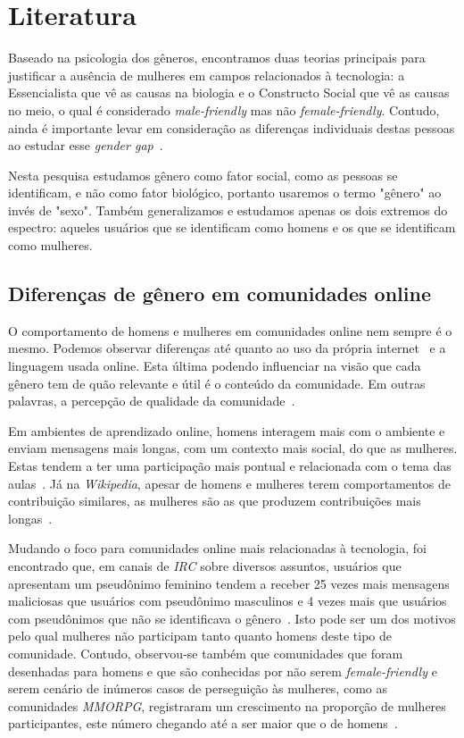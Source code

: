 \chapter{Literatura}

Baseado na psicologia dos gêneros, encontramos duas teorias principais para justificar a ausência de mulheres em campos relacionados à tecnologia: a Essencialista que vê as causas na biologia e o Constructo Social que vê as causas no meio, o qual é considerado \emph{male-friendly} mas não \emph{female-friendly}. Contudo, ainda é importante levar em consideração as diferenças individuais destas pessoas ao estudar esse \emph{gender gap}~\cite{trauth2004understanding}.

Nesta pesquisa estudamos gênero como fator social, como as pessoas se identificam, e não como fator biológico, portanto usaremos o termo "gênero" ao invés de "sexo". Também generalizamos e estudamos apenas os dois extremos do espectro: aqueles usuários que se identificam como homens e os que se identificam como mulheres. 

\section{Diferenças de gênero em comunidades online}

O comportamento de homens e mulheres em comunidades online nem sempre é o mesmo. Podemos observar diferenças até quanto ao uso da própria internet~\cite{hargittai2006differences} e a linguagem usada online. Esta última podendo influenciar na visão que cada gênero tem  de quão relevante e útil é o conteúdo da comunidade. Em outras palavras, a percepção de qualidade da comunidade~\cite{Gefen:2005:YSS:1066149.1066156}.

Em ambientes de aprendizado online, homens interagem mais com o ambiente e enviam mensagens mais longas, com um contexto mais social, do que as mulheres. Estas tendem a ter uma participação mais pontual e relacionada com o tema das aulas~\cite{barrett1999gender}. Já na \emph{Wikipedia}, apesar de homens e mulheres terem comportamentos de contribuição similares, as mulheres são as que produzem contribuições mais longas~\cite{glott2010wikipedia}.

Mudando o foco para comunidades online mais relacionadas à tecnologia, foi encontrado que, em canais de \emph{IRC} sobre diversos assuntos, usuários que apresentam um pseudônimo feminino tendem a receber 25 vezes mais mensagens maliciosas que usuários com pseudônimo masculinos e 4 vezes mais que usuários com pseudônimos que não se identificava o gênero~\cite{meyer2006assessing}. Isto pode ser um dos motivos pelo qual mulheres não participam tanto quanto homens deste tipo de comunidade. Contudo, observou-se também que comunidades que foram desenhadas para homens e que são conhecidas por não serem \textit{female-friendly} e serem cenário de inúmeros casos de perseguição às mulheres, como as comunidades \emph{MMORPG}, registraram um crescimento na proporção de mulheres participantes, este número chegando até a ser maior que o de homens~\cite{taylor2003multiple}. 

